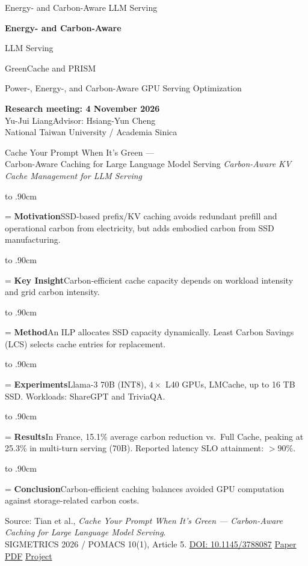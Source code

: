 \documentclass[aspectratio=169,10pt]{beamer}
\newcommand{\point}[2]{\par\vbox to .90cm{\hsize=\linewidth
\textbf{\color{Accent}#1}\quad #2\par\vfil}}
\newcommand{\meta}[1]{{\small\color{Muted}\textit{#1}}\par\medskip}
\newcommand{\src}[1]{\par\vfill{\scriptsize\color{Muted}Source: #1\par}}
\begin{document}
\begin{frame}[c]{Energy- and Carbon-Aware LLM Serving}
\relax
{\LARGE\bfseries Energy- and Carbon-Aware\par\medskip LLM Serving\par}
\bigskip
{\large\color{Accent}GreenCache and PRISM}\par\medskip
{\color{Muted}Power-, Energy-, and Carbon-Aware GPU Serving Optimization}\par
\bigskip
\textbf{Research meeting: 4 November 2026}\\
Yu-Jui Liang\quad Advisor: Hsiang-Yun Cheng\\
National Taiwan University / Academia Sinica
\end{frame}

\begin{frame}[t]{Cache Your Prompt When It's Green ---\\Carbon-Aware Caching for Large Language Model Serving}
\meta{Carbon-Aware KV Cache Management for LLM Serving}
\point{Motivation}{SSD-based prefix/KV caching avoids redundant prefill and operational carbon from electricity, but adds embodied carbon from SSD manufacturing.}
\point{Key Insight}{Carbon-efficient cache capacity depends on workload intensity and grid carbon intensity.}
\point{Method}{An ILP allocates SSD capacity dynamically. Least Carbon Savings (LCS) selects cache entries for replacement.}
\point{Experiments}{Llama-3 70B (INT8), $4\times$ L40 GPUs, LMCache, up to 16 TB SSD. Workloads: ShareGPT and TriviaQA.}
\point{Results}{In France, 15.1\% average carbon reduction vs.\ Full Cache, peaking at 25.3\% in multi-turn serving (70B). Reported latency SLO attainment: $>90\%$.}
\point{Conclusion}{Carbon-efficient caching balances avoided GPU computation against storage-related carbon costs.}
\src{Tian et al., \textit{Cache Your Prompt When It's Green --- Carbon-Aware Caching for Large Language Model Serving}.\\
SIGMETRICS 2026 / POMACS 10(1), Article 5.\quad
\href{https://doi.org/10.1145/3788087}{DOI: 10.1145/3788087}\quad
\href{https://arxiv.org/pdf/2505.23970v3}{Paper PDF}\quad
\href{https://greencache.persistentmemory.org}{Project}}
\end{frame}
\end{document}
